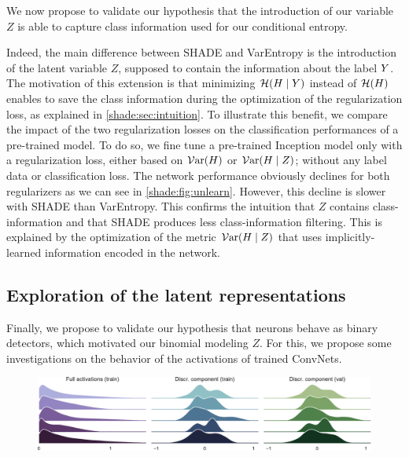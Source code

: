 We now propose to validate our hypothesis that the introduction of our variable $Z$ is able to capture class information used for our conditional entropy.

Indeed, the main difference between \ac{SHADE} and VarEntropy is the introduction of the latent variable $Z$, supposed to contain the information about the label $Y$. The motivation of this extension is that minimizing $\mathcal{H}(H\mid Y)$ instead of $\mathcal{H}(H)$ enables to save the class information during the optimization of the regularization loss, as explained in \autoref{shade:sec:intuition}. To illustrate this benefit, we compare the impact of the two regularization losses on the classification performances of a pre-trained model. To do so, we fine tune a pre-trained Inception model only with a regularization loss, either based on $\mathcal{V}\mathrm{ar}(H)$ or $\mathcal{V}\mathrm{ar}(H\mid Z)$; without any label data or classification loss. The network performance obviously declines for both regularizers as we can see in \autoref{shade:fig:unlearn}. However, this decline is slower with \ac{SHADE} than VarEntropy.
This confirms the intuition that $Z$ contains class-information and that \ac{SHADE} produces less class-information filtering. This is explained by the optimization of the metric $\mathcal{V}\mathrm{ar}(H\mid Z)$ that uses implicitly-learned information encoded in the network.




\subsection{Exploration of the latent representations}
\label{shadeA:sec:exp_latent}

Finally, we propose to validate our hypothesis that neurons behave as binary detectors, which motivated our binomial modeling $Z$. For this, we propose some investigations on the behavior of the activations of trained \acp{ConvNet}.

\begin{figure}[tb]
    
    \includegraphics[width=\textwidth]{images/shade_Inception_activ}
    
    \label{shade:fig:activation}
\end{figure}

